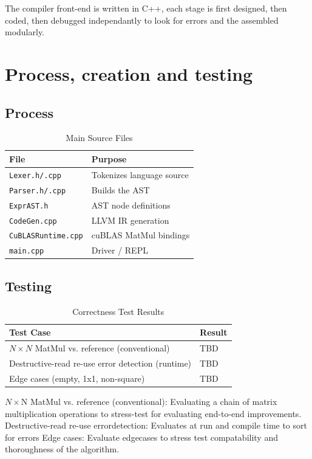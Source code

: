 \documentclass[a4paper]{article}
\begin{document}
	The compiler front-end is written in C++, each stage is first designed, then coded, then debugged independantly to look for errors and the assembled modularly.
	\section{Process, creation and testing}
	\subsection{Process}

		\begin{table}[h]
		\centering
		\caption{Main Source Files}
		\label{tab:modules}
		\begin{tabular}{ll}
			\toprule
			File & Purpose \\
			\midrule
			\texttt{Lexer.h/.cpp} & Tokenizes language source \\
			\texttt{Parser.h/.cpp} & Builds the AST \\
			\texttt{ExprAST.h} & AST node definitions \\
			\texttt{CodeGen.cpp} & LLVM IR generation \\
			\texttt{CuBLASRuntime.cpp} & cuBLAS MatMul bindings \\
			\texttt{main.cpp} & Driver / REPL \\
			\bottomrule
		\end{tabular}
	\end{table}
	
	
	
	
	\subsection{Testing}
	
	\begin{table}[h]
		\centering
		\caption{Correctness Test Results}
		\label{tab:verification}
		\begin{tabular}{ll}
			\toprule
			Test Case & Result \\
			\midrule
			$N \times N$ MatMul vs. reference (conventional) & TBD \\
			Destructive-read re-use error detection (runtime) & TBD \\
			Edge cases (empty, 1x1, non-square) & TBD \\
			\bottomrule
		\end{tabular}
	\end{table}

	$N \times $N MatMul vs. reference (conventional): Evaluating a chain of matrix multiplication operations to stress-test for evaluating end-to-end improvements.
	Destructive-read re-use errordetection: Evaluates at run and compile time to sort for errors 
	Edge cases: Evaluate edgecases to stress test compatability and thoroughness of the algorithm.
	
\end{document}
